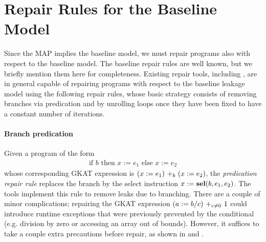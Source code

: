 \section{Repair Rules for the Baseline Model}
Since the MAP implies the baseline model, we must repair programs also with respect to the baseline model. The baseline repair rules are well known, but we briefly mention them here for completeness. Existing repair tools, including \cite{Racoon,SCEliminator,MSESC}, are in general capable of repairing programs with respect to the baseline leakage model using the following repair rules, whose basic strategy consists of removing branches via {predication} and by unrolling loops once they have been fixed to have a constant number of iterations. 

\paragraph*{Branch predication} Given a program of the form 
\begin{align*}
    \text{if $b$ then $x:=e_1$ else $x:=e_2$}
\end{align*}
whose corresponding GKAT expression is $\branch{b}{(x:=e_1)}{(x:=e_2)}$, the \emph{predication repair rule} replaces the branch by the select instruction $x:=\sel(b,e_1,e_2)$. The tools \cite{Racoon,SCEliminator,MSESC} implement this rule to remove leaks due to branching.
There are a couple of minor complications; repairing the GKAT expression $\branch{c\neq0}{(a:=b/c)}{1}$
could introduce runtime exceptions that were previously prevented by the conditional (e.g. division by zero or accessing an array out of bounds). However, it suffices to take a couple extra precautions before repair, as shown in \cite{Racoon} and \cite{MSESC}. 




